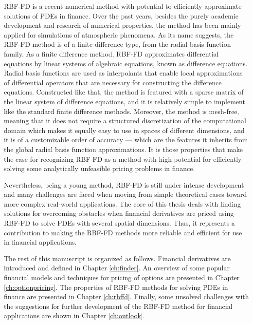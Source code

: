 \documentclass{UUThesisTemplate}
\begin{document}
\par RBF-FD is a recent numerical method with potential to efficiently approximate solutions of PDEs in finance. Over the past years, besides the purely academic development and research of numerical properties, the method has been mainly applied for simulations of atmospheric phenomena. As its name suggests, the RBF-FD method is of a finite difference type, from the radial basis function family. As a finite difference method, RBF-FD approximates differential equations by linear systems of algebraic equations, known as difference equations. Radial basis functions are used as interpolants that enable local approximations of differential operators that are necessary for constructing the difference equations. Constructed like that, the method is featured with a sparse matrix of the linear system of difference equations, and it is relatively simple to implement like the standard finite difference methods. Moreover, the method is mesh-free, meaning that it does not require a structured discretization of the computational domain which makes it equally easy to use in spaces of different dimensions, and it is of a customizable order of accuracy --- which are the features it inherits from the global radial basis function approximations. It is those properties that make the case for recognizing RBF-FD as a method with high potential for efficiently solving some analytically unfeasible pricing problems in finance.
\par Nevertheless, being a young method, RBF-FD is still under intense development and many challenges are faced when moving from simple theoretical cases toward more complex real-world applications. The core of this thesis deals with finding solutions for overcoming obstacles when financial derivatives are priced using RBF-FD to solve PDEs with several spatial dimensions. Thus, it represents a contribution to making the RBF-FD methods more reliable and efficient for use in financial applications. 
\par The rest of this manuscript is organized as follows. Financial derivatives are introduced and defined in Chapter \ref{ch:finder}. An overview of some popular financial models and techniques for pricing of options are presented in Chapter \ref{ch:optionpricing}. The properties of RBF-FD methods for solving PDEs in finance are presented in Chapter \ref{ch:rbffd}. Finally, some unsolved challenges with the suggestions for further development of the RBF-FD method for financial applications are shown in Chapter \ref{ch:outlook}.
\end{document}
